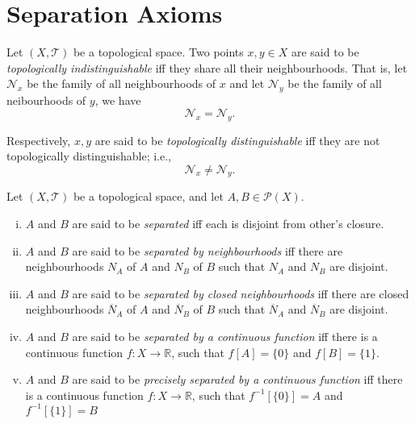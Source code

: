 \section{Separation Axioms}


\begin{definition}
	\label{def: topologically indistinguishable}
	Let $(X, \mathcal T)$ be a topological space. Two points $x,y \in X$ are said to be \textit{topologically indistinguishable} iff they share all their neighbourhoods. That is, let $\mathcal N_x$ be the family of all neighbourhoods of $x$ and let $\mathcal N_y$ be the family of all neibourhoods of $y$, we have
	$$
	\mathcal N_x = \mathcal N_y.
	$$
	
	Respectively, $x,y$ are said to be \textit{topologically distinguishable} iff they are not topologically distinguishable; i.e.,
	$$
	\mathcal N_x \ne \mathcal N_y.
	$$
\end{definition}


\begin{definition}
	Let $(X, \mathcal T)$ be a topological space, and let $A, B \in \mathcal P(X)$.
	
	\begin{enumerate}[(i)]
		\item $A$ and $B$ are said to be \textit{separated} iff each is disjoint from other's closure.
		\item $A$ and $B$ are said to be \textit{separated by neighbourhoods} iff there are neighbourhoods $N_A$ of $A$ and $N_B$ of $B$ such that $N_A$ and $N_B$ are disjoint.
		\item $A$ and $B$ are said to be \textit{separated by closed neighbourhoods} iff there are closed neighbourhoods $\overline N_A$ of $A$ and $\overline N_B$ of $B$ such that $\overline N_A$ and $\overline N_B$ are disjoint.
		\item $A$ and $B$ are said to be \textit{separated by a continuous function} iff there is a continuous function $f: X \to \mathbb R$, such that $f[A] = \{0\}$ and $f[B] = \{1\}$.
		\item $A$ and $B$ are said to be \textit{precisely separated by a continuous function} iff there is a continuous function $f: X \to \mathbb R$, such that $f^{-1}[\{0\}] = A$ and $f^{-1}[\{1\}] = B$
	\end{enumerate}
\end{definition}


